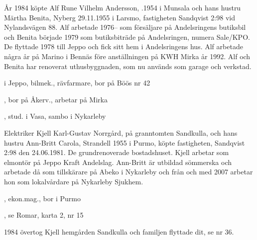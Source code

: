 %



%
År 1984 köpte Alf Rune Vilhelm Andersson, .1954 i Munsala och hans hustru Märtha Benita, \textborn Nyberg 29.11.1955 i Larsmo, fastigheten Sandqvist 2:98 vid Nylandsvägen 88. Alf arbetade 1976-- som försäljare på Andelsringens butiksbil och Benita började 1979 som butiksbiträde på Andelsringen, numera Sale/KPO. De flyttade 1978 till Jeppo och fick sitt hem i Andelsringens hus. Alf arbetade några år på Marino i Bennäs före anställningen på KWH Mirka år 1992. Alf och Benita har renoverat uthusbyggnaden, som nu används som garage och verkstad.
\begin{jhchildren}
  \item {} i Jeppo, bilmek., rävfarmare, bor på Böös nr 42
  \item {}, bor på Åkerv., arbetar på Mirka
  \item {}, stud. i Vasa, sambo i Nykarleby
\end{jhchildren}


%
Elektriker Kjell Karl-Gustav Norrgård,  på granntomten Sandkulla, och hans hustru Ann-Britt Carola, \textborn Strandell 1955 i Purmo, köpte fastigheten, Sandqvist 2:98 den 24.06.1981. De grundrenoverade bostadshuset. Kjell arbetar som elmontör på Jeppo Kraft Andelslag. Ann-Britt är utbildad sömmerska och arbetade då som tillskärare på Abeko i Nykarleby och från och med 2007 arbetar hon som lokalvårdare på Nykarleby Sjukhem.
\begin{jhchildren}
  \item {}, ekon.mag., bor i Purmo
  \item {}, se Romar, karta 2, nr 15
\end{jhchildren}

1984 övertog Kjell hemgården Sandkulla och familjen flyttade dit, se nr 36.


